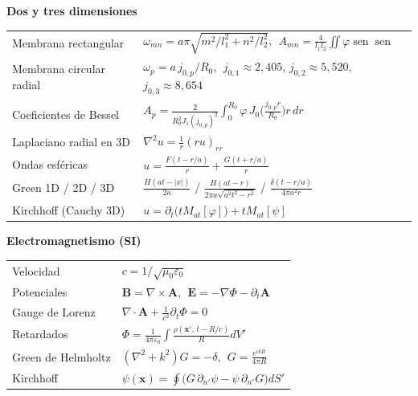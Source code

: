 \documentclass[
  spanish,
  a4paper,
]{scrbook}
\newcounter{none} %
\theoremstyle{definition}
\theoremstyle{plain}
\theoremstyle{definition}
\theoremstyle{plain}
\theoremstyle{definition}
\theoremstyle{remark}
\begin{document}
\textbf{Dos y tres dimensiones}

{\def\LTcaptype{none} %
\begin{longtable}[]{@{}
  >{\raggedright\arraybackslash}p{}
  >{\raggedright\arraybackslash}p{}@{}}
\toprule\noalign{}
\endhead
\bottomrule\noalign{}
\endlastfoot
Membrana rectangular &
\(\omega_{mn} = a\pi\sqrt{m^2/l_1^2 + n^2/l_2^2}\),
\(\;A_{mn} = \frac{4}{l_1l_2}\iint\varphi\operatorname{sen}\operatorname{sen}\) \\
Membrana circular radial & \(\omega_p = a\,j_{0,p}/R_0\),
\(\;j_{0,1}\approx2{,}405\), \(j_{0,2}\approx5{,}520\),
\(j_{0,3}\approx8{,}654\) \\
Coeficientes de Bessel &
\(A_p = \frac{2}{R_0^2J_1(j_{0,p})^2}\int_0^{R_0}\varphi\,J_0\big(\tfrac{j_{0,p}r}{R_0}\big)r\,dr\) \\
Laplaciano radial en 3D & \(\nabla^2u = \frac1r(ru)_{rr}\) \\
Ondas esféricas & \(u = \frac{F(t-r/a)}{r} + \frac{G(t+r/a)}{r}\) \\
Green 1D / 2D / 3D & \(\frac{H(at-\lvert x\rvert)}{2a}\) /
\(\frac{H(at-r)}{2\pi a\sqrt{a^2t^2-r^2}}\) /
\(\frac{\delta(t-r/a)}{4\pi a^2 r}\) \\
Kirchhoff (Cauchy 3D) &
\(u = \partial_t\big(tM_{at}[\varphi]\big) + tM_{at}[\psi]\) \\
\end{longtable}
}

\textbf{Electromagnetismo (SI)}

{\def\LTcaptype{none} %
\begin{longtable}[]{@{}
  >{\raggedright\arraybackslash}p{}
  >{\raggedright\arraybackslash}p{}@{}}
\toprule\noalign{}
\endhead
\bottomrule\noalign{}
\endlastfoot
Velocidad & \(c = 1/\sqrt{\mu_0\varepsilon_0}\) \\
Potenciales & \(\mathbf B = \nabla\times\mathbf A\),
\(\;\mathbf E = -\nabla\Phi - \partial_t\mathbf A\) \\
Gauge de Lorenz &
\(\nabla\cdot\mathbf A + \frac1{c^2}\partial_t\Phi = 0\) \\
Retardados &
\(\Phi = \frac{1}{4\pi\varepsilon_0}\int\frac{\rho(\mathbf x',\,t-R/c)}{R}dV'\) \\
Green de Helmholtz & \((\nabla^2+k^2)G = -\delta\),
\(\;G = \frac{e^{ikR}}{4\pi R}\) \\
Kirchhoff &
\(\psi(\mathbf x) = \oint\big(G\,\partial_{n'}\psi - \psi\,\partial_{n'}G\big)dS'\) \\
\end{longtable}
}
\end{document}
